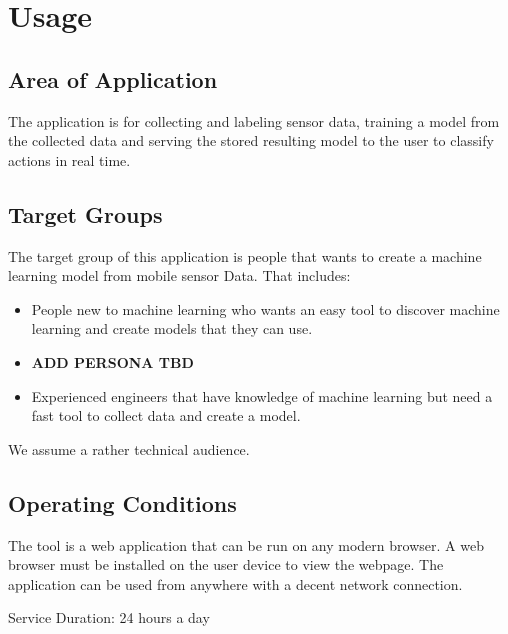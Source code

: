 \section{Usage}
\subsection{Area of Application}
The application is for collecting and labeling sensor data, training a model from the collected data and serving the stored resulting model to the user to classify actions in real time.

\subsection{Target Groups}
The target group of this application is people that wants to create a machine learning model from mobile sensor Data.
That includes: 
\begin{itemize}
    \item People new to machine learning who wants an easy tool to discover machine learning and create models that they can use.
    \item \textbf{ADD PERSONA TBD}
    \item Experienced engineers that have knowledge of machine learning but need a fast tool to collect data and create a model.
\end{itemize}
We assume a rather technical audience. %

\subsection{Operating Conditions}
The tool is a web application that can be run on any modern browser. A web browser must be installed on the user device to view the webpage. The application can be used from anywhere with a decent network connection.

Service Duration: 24 hours a day